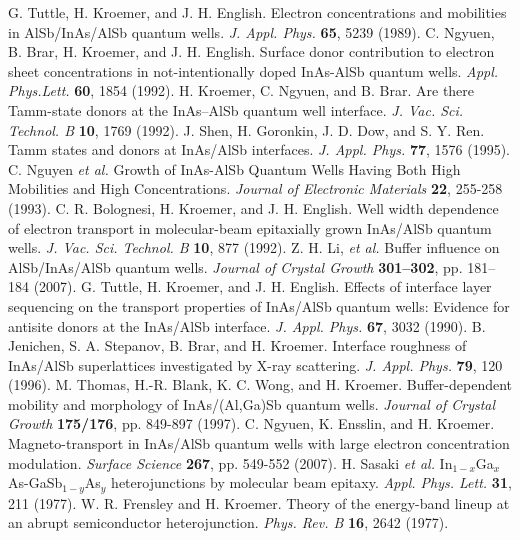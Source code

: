 \documentclass[titlepage,a4paper]{book}
\begin{document}
\begin{thebibliography}{199}
G. Tuttle, H. Kroemer, and J. H. English. Electron concentrations and mobilities in AlSb/InAs/AlSb quantum wells. \textit{J. Appl. Phys.} \textbf{65}, 5239 (1989).
C. Ngyuen, B. Brar, H. Kroemer, and J. H. English. Surface donor contribution to electron sheet concentrations in not-intentionally doped InAs-AlSb quantum wells. \textit{Appl. Phys.Lett.} \textbf{60}, 1854 (1992).
H. Kroemer, C. Ngyuen, and B. Brar. Are there Tamm-state donors at the InAs–AlSb quantum well interface. \textit{J. Vac. Sci. Technol. B} \textbf{10}, 1769 (1992). 
J. Shen, H. Goronkin, J. D. Dow, and S. Y. Ren. Tamm states and donors at InAs/AlSb interfaces. \textit{J. Appl. Phys.} \textbf{77}, 1576 (1995).
C. Nguyen \textit{et al.} Growth of InAs-AlSb Quantum Wells Having Both High Mobilities and High Concentrations. \textit{Journal of Electronic Materials} \textbf{22}, 255-258 (1993).
C. R. Bolognesi, H. Kroemer, and J. H. English. Well width dependence of electron transport in molecular-beam epitaxially grown InAs/AlSb quantum wells. \textit{J. Vac. Sci. Technol. B} \textbf{10}, 877 (1992).
Z. H. Li, \textit{et al.} Buffer influence on AlSb/InAs/AlSb quantum wells. \textit{Journal of Crystal Growth} \textbf{301–302}, pp. 181–184 (2007).
G. Tuttle, H. Kroemer, and J. H. English. Effects of interface layer sequencing on the transport properties of InAs/AlSb quantum wells: Evidence for antisite donors at the InAs/AlSb interface. \textit{J. Appl. Phys.} \textbf{67}, 3032 (1990).
B. Jenichen, S. A. Stepanov, B. Brar, and H. Kroemer. Interface roughness of InAs/AlSb superlattices investigated by X-ray scattering. \textit{J. Appl. Phys.} \textbf{79}, 120 (1996).
M. Thomas, H.-R. Blank, K. C. Wong, and H. Kroemer. Buffer-dependent mobility and morphology of InAs/(Al,Ga)Sb quantum wells. \textit{Journal of Crystal Growth} \textbf{175/176}, pp. 849-897 (1997).
C. Ngyuen, K. Ensslin, and H. Kroemer. Magneto-transport in InAs/AlSb quantum wells with large electron concentration modulation. \textit{Surface Science} \textbf{267}, pp. 549-552 (2007).
H. Sasaki \textit{et al.} In$_{1-x}$Ga$_x$As-GaSb$_{1-y}$As$_y$ heterojunctions by molecular beam epitaxy. \textit{Appl. Phys. Lett.} \textbf{31}, 211 (1977).
W. R. Frensley and H. Kroemer. Theory of the energy-band lineup at an abrupt semiconductor heterojunction. \textit{Phys. Rev. B} \textbf{16}, 2642 (1977).

\end{thebibliography}
\end{document}
